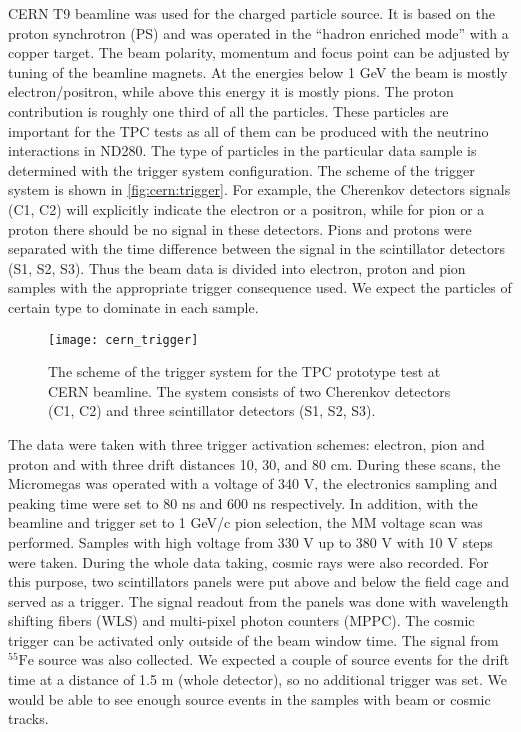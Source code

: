 \documentclass[../main.tex]{subfiles}
\begin{document}
CERN T9 beamline was used for the charged particle source. It is based on the proton synchrotron (PS) and was operated in the ``hadron enriched mode'' with a copper target. The beam polarity, momentum and focus point can be adjusted by tuning of the beamline magnets.
At the energies below 1 GeV the beam is mostly electron/positron, while above this energy it is mostly pions. The proton contribution is roughly one third of all the particles. These particles are important for the TPC tests as all of them can be produced with the neutrino interactions in ND280. The type of particles in the particular data sample is determined with the trigger system configuration. The scheme of the trigger system is shown in \autoref{fig:cern:trigger}.  For example, the Cherenkov detectors signals (C1, C2)  will explicitly indicate the electron or a positron, while for pion or a proton there should be no signal in these detectors. Pions and protons were separated with the time difference between the signal in the scintillator detectors (S1, S2, S3). Thus the beam data is divided into electron, proton and pion samples with the appropriate trigger consequence used. We expect the particles of certain type to dominate in each sample.

\begin{figure}[!ht]
   \centering
   \texttt{[image: cern\_trigger]}
   \caption{The scheme of the trigger system for the TPC prototype test at CERN beamline. The system consists of two Cherenkov detectors (C1, C2) and three scintillator detectors (S1, S2, S3).}
   \label{fig:cern:trigger}
 \end{figure}

The data were taken with three trigger activation schemes: electron, pion and proton and with three drift distances 10, 30, and 80 cm. During these scans, the Micromegas was operated with a voltage of 340 V, the electronics sampling and peaking time were set to 80 ns and 600 ns respectively. In addition, with the beamline and trigger set to 1 GeV/c pion selection, the MM voltage scan was performed. Samples with high voltage from 330 V up to 380 V with 10 V steps were taken. During the whole data taking, cosmic rays were also recorded. For this purpose, two scintillators panels were put above and below the field cage and served as a trigger. The signal readout from the panels was done with wavelength shifting fibers (WLS) and multi-pixel photon counters (MPPC). The cosmic trigger can be activated only outside of the beam window time. The signal from ${}^{55}\text{Fe}$ source was also collected. We expected a couple of source events for the drift time at a distance of 1.5 m (whole detector), so no additional trigger was set. We would be able to see enough source events in the samples with beam or cosmic tracks.
\end{document}
